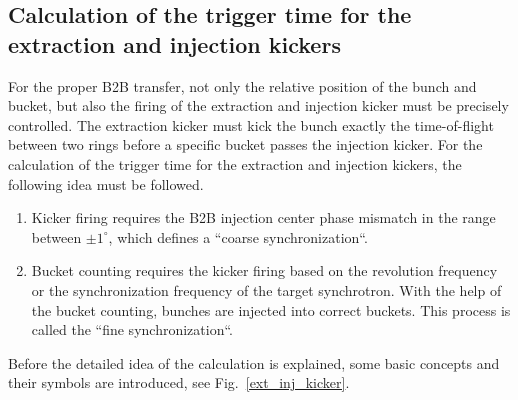 \subsection{Calculation of the trigger time for the extraction and injection kickers}
\label{sec:compensation}
For the proper B2B transfer, not only the relative position of the bunch and bucket, but also the firing of the extraction and injection kicker must be precisely controlled. The extraction kicker must kick the bunch exactly the time-of-flight between two rings before a specific bucket passes the injection kicker. For the calculation of the trigger time for the extraction and injection kickers, the following idea must be followed. 
\begin{enumerate}
\item Kicker firing requires the B2B injection center phase mismatch in the range between $\pm 1^\circ$, which defines a ``coarse synchronization``.
\item Bucket counting requires the kicker firing based on the revolution frequency or the synchronization frequency of the target synchrotron. With the help of the bucket counting, bunches are injected into correct buckets. This process is called the ``fine synchronization``.
\end{enumerate}

Before the detailed idea of the calculation is explained, some basic concepts and their symbols are introduced, see Fig.~\ref{ext_inj_kicker}.

